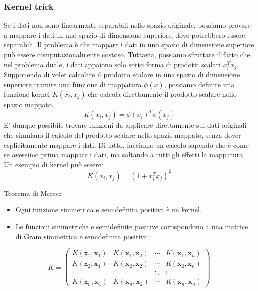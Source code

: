\subsubsection{Kernel trick}
Se i dati non sono linearmente separabili nello spazio originale, possiamo provare a mappare i dati in uno spazio di dimensione superiore, dove potrebbero essere separabili.
Il problema è che mappare i dati in uno spazio di dimensione superiore può essere computazionalmente costoso. Tuttavia, possiamo sfruttare il fatto che nel problema duale, i dati appaiono solo sotto forma di prodotti scalari $ x_i^{T} x_j $. Supponendo di voler calcolare il prodotto scalare in uno spazio di dimensione superiore tramite una funzione di mappatura $ \phi\left(x\right) $, possiamo definire una funzione kernel $ K\left(x_i, x_j\right) $ che calcola direttamente il prodotto scalare nello spazio mappato.
\[
	K\left(x_i, x_j\right) = \phi \left(x_i\right)^{T} \phi \left(x_j\right)
\]
E' dunque possibile trovare funzioni da applicare direttamente sui dati originali che simulano il calcolo del prodotto scalare nello spazio mappato, senza dover esplicitamente mappare i dati. Di fatto, facciamo un calcolo sapendo che è come se avessimo prima mappato i dati, ma saltando a tutti gli effetti la mappatura. Un esempio di kernel può essere:
\[
	K\left(x_i, x_j\right) = \left(1 + x_i^{T} x_j\right)^2
\]
\begin{teorema}{Teorema di Mercer}
	\begin{itemize}
		\item Ogni funzione simmetrica e semidefinita positiva è un kernel.
		\item Le funzioni simmetriche e semidefinite positive corrispondono a una matrice di Gram simmetrica e semidefinita positiva:
	\end{itemize}

	\[
		K =
		\begin{pmatrix}
			K(\mathbf{x}_1, \mathbf{x}_1) & K(\mathbf{x}_1, \mathbf{x}_2) & \cdots & K(\mathbf{x}_1, \mathbf{x}_n) \\
			K(\mathbf{x}_2, \mathbf{x}_1) & K(\mathbf{x}_2, \mathbf{x}_2) & \cdots & K(\mathbf{x}_2, \mathbf{x}_n) \\
			\vdots                        & \vdots                        & \ddots & \vdots                        \\
			K(\mathbf{x}_n, \mathbf{x}_1) & K(\mathbf{x}_n, \mathbf{x}_2) & \cdots & K(\mathbf{x}_n, \mathbf{x}_n)
		\end{pmatrix}
	\]
\end{teorema}

